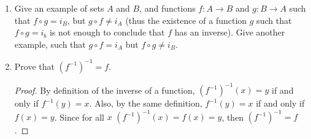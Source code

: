 \documentclass[12pt]{article}
\begin{document}
\begin{enumerate}
	\begin{proof}
		Theorem 16.4 tells us that $(a)\implies(b)$ and $(a)\implies(c)$. Theorem 16.8 tells us $(c)\implies(b)$. Now if we prove $(b)\implies(a)$ equivalence is shown.
		
		Suppose $f$ has an inverse $f^{-1}:B\to A$ such that $f^{-1}\circ f=i_A$ and $f\circ f^{-1}=i_B$. 
		
		If $f(x_1)=f(x_2)$, then $f^{-1}(f(x_1))=f^{-1}(f(x_2))$. Hence $i_A(x_1)=i_A(x_2)$. Therefore $x_1=x_2$. Showing $f$ is one-to-one.
		
		Now we will show $f$ is onto. Let $y\in B$ and set $x=f^{-1}(y)$. Then $x\in A$, and $f(x)=f(f^{-1}(y))=y$. Lemma 15.1 implies that $f$ is onto.
		
		Since $f$ was shown to be one-to-one and onto, it a bijection.
		
		All the implications that needed to shown were.
	\end{proof}
	
	\newpage
	
	\item Give an example of sets $A$ and $B$, and functions $f:A\to B$ and $g:B\to A$ such that $f\circ g=i_B$, but $g\circ f\not=i_A$ (thus the existence of a function $g$ such that $f\circ g=i_b$ is not enough to conclude that $f$ has an inverse). Give another example, such that $g\circ f=i_A$ but $f\circ g\not=i_B$.
	
	\newpage
	
	\item Prove that $(f^{-1})^{-1}=f$.
	
	\begin{proof}
		By definition of the inverse of a function, $(f^{-1})^{-1}(x)=y$ if and only if $f^{-1}(y)=x$. Also, by the same definition, $f^{-1}(y)=x$ if and only if $f(x)=y$. Since for all $x$ $(f^{-1})^{-1}(x)=f(x)=y$, then $(f^{-1})^{-1}=f$.
	\end{proof}
	
	\end{enumerate}
\end{document}
